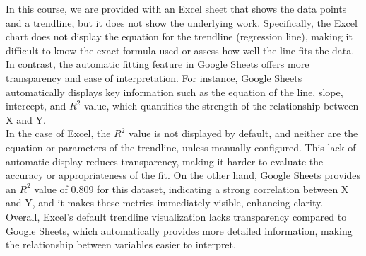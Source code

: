 \documentclass[12pt]{article}
\begin{document}
In this course, we are provided with an Excel sheet that shows the data points and a trendline, but it does not show the underlying work. Specifically, the Excel chart does not display the equation for the trendline (regression line), making it difficult to know the exact formula used or assess how well the line fits the data. In contrast, the automatic fitting feature in Google Sheets offers more transparency and ease of interpretation. For instance, Google Sheets automatically displays key information such as the equation of the line, slope, intercept, and \(R^2\) value, which quantifies the strength of the relationship between X and Y. \\

In the case of Excel, the \(R^2\) value is not displayed by default, and neither are the equation or parameters of the trendline, unless manually configured. This lack of automatic display reduces transparency, making it harder to evaluate the accuracy or appropriateness of the fit. On the other hand, Google Sheets provides an \(R^2\)
value of 0.809 for this dataset, indicating a strong correlation between X and Y, and it makes these metrics immediately visible, enhancing clarity. \\

Overall, Excel's default trendline visualization lacks transparency compared to Google Sheets, which automatically provides more detailed information, making the relationship between variables easier to interpret.
\end{document}
